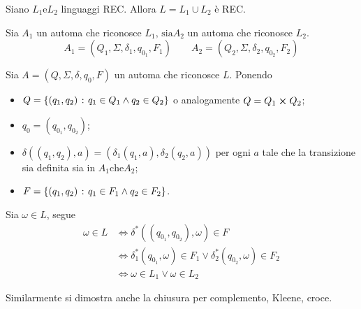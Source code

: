 \documentclass{subfiles}
\begin{document}
\begin{Theorem}
    Siano \(L_{1} \text{e} L_{2}\) linguaggi REC. Allora \(L = L_{1} \cup L_{2}\) è REC.

    \begin{Proof*}
        Sia \(A_{1}\) un automa che riconosce \(L_{1} \text{, sia} A_{2}\) un automa che riconosce \(L_{2}\).
        \[
            A_{1} = (Q_{1}, \Sigma, \delta_{1}, q_{0_{1}}, F_{1}) \qquad A_{2} = (Q_{2}, \Sigma, \delta_{2}, q_{0_{2}}, F_{2})
        \]

        \noindent Sia \(A = (Q, \Sigma, \delta, q_{0}, F)\) un automa che riconosce \(L\). Ponendo
        \begin{itemize}
            \item \(Q = \left\{(q_{1}, q_{2}) \operatorname{\: {:} \:} q_{1} \in Q_{1} \land q_{2} \in Q_{2}\right\}\) o analogamente \(Q = Q_{1} \cp Q_{2}\);
            \item \(q_{0} = (q_{0_{1}}, q_{0_{2}})\);
            \item \(\delta((q_{1}, q_{2}), a) = (\delta_{1}(q_{1}, a), \delta_{2}(q_{2}, a))\) per ogni \(a\) tale che la transizione sia definita sia in \(A_{1} \text{che} A_{2}\);
            \item \(F = \left\{(q_{1}, q_{2}) \operatorname{\: {:} \:} q_{1} \in F_{1} \land q_{2} \in F_{2}\right\}\).
        \end{itemize}

        \noindent Sia \(\omega \in L\), segue
        \[\begin{aligned}
                \omega \in L & \iff \delta^{*}((q_{0_{1}}, q_{0_{2}}), \omega) \in F                                             \\
                             & \iff \delta_{1}^{*}(q_{0_{1}}, \omega) \in F_{1} \lor \delta_{2}^{*}(q_{0_{2}}, \omega) \in F_{2} \\
                             & \iff \omega \in L_{1} \lor \omega \in L_{2}
            \end{aligned}\]
    \end{Proof*}
\end{Theorem}

\begin{Note*}
    Similarmente si dimostra anche la chiusura per complemento, Kleene, croce.
\end{Note*}

\clearpage
\end{document}
